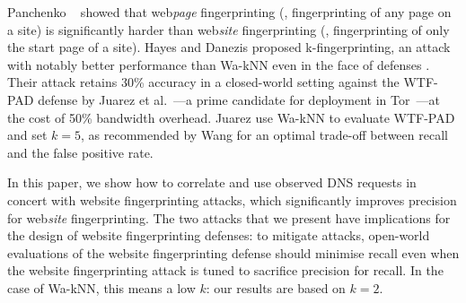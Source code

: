 Panchenko \ea~\cite{Panchenko2016a} showed that web\emph{page}
fingerprinting (\ie, fingerprinting of any page on a site) is
significantly harder than web\emph{site} fingerprinting (\ie,
fingerprinting of only the start page of a site).  Hayes and Danezis
proposed k-fingerprinting, an attack with notably better performance
than Wa-kNN even in the face of defenses
\cite{kfingerprinting}. Their attack retains 30\% accuracy in a
closed-world setting against the WTF-PAD defense by Juarez et
al.~\cite{DBLP:journals/corr/JuarezIPDW15}---a prime candidate for
deployment in Tor~\cite{adapativepadding}---at the cost of 50\% bandwidth
overhead. Juarez \ea use Wa-kNN to evaluate WTF-PAD and set $k=5$, as
recommended by Wang \ea for an optimal trade-off between recall and the
false positive rate.

In this paper, we show how to correlate and use observed DNS requests in
concert with website fingerprinting attacks,
which significantly
improves precision for web\emph{site} fingerprinting.
The two \name attacks that we present have implications
for the design of website fingerprinting defenses:
to mitigate \name attacks, open-world evaluations of the website fingerprinting
defense should minimise recall even when the website fingerprinting attack is
tuned to sacrifice precision for recall.  In the case of Wa-kNN, this means
a low $k$: our results are based on $k=2$.
